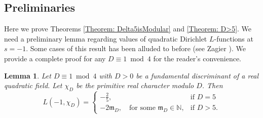 \documentclass[11pt]{amsart}
\numberwithin{equation}{section}
\newtheorem{lem}[thm]{Lemma}
\theoremstyle{remark}
\begin{document}
\subsection{Preliminaries} Here we prove Theorems \ref{Theorem: Delta5isModular} and \ref{Theorem: D>5}. We need a preliminary lemma regarding values of quadratic Dirichlet $L$-functions at $s=-1$. Some cases of this result has been alluded to before (see Zagier \cite[Pg. 54]{Zagier}). We provide a complete proof for any $D \equiv 1 \bmod 4$ for the reader's convenience.
\begin{lem}\label{lem: Value at s=-1}
Let $D\equiv 1\bmod{4}$ with $D>0$ be a fundamental discriminant of a real quadratic field. Let $\chi_{D}$ be the primitive real character modulo $D$. Then 
\[
L(-1,{\chi_D}) = \begin{cases}
  -\frac{2}{5},  & \textrm{if } D=5 \\
  -2\mathfrak{m}_D, \quad \textrm{for some $\mathfrak{m}_D \in \mathbb{N}$}, & \textrm{if } D > 5.
\end{cases}
\]
\end{lem}
\end{document}
